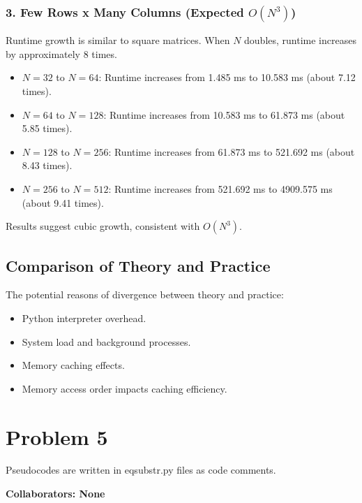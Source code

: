 \documentclass[12 pt]{article}
\begin{document}
\subsubsection*{3. Few Rows x Many Columns (Expected $O(N^3)$)}
Runtime growth is similar to square matrices. When $N$ doubles, runtime increases by approximately 8 times.

    \begin{itemize}
        \item $N = 32$ to $N = 64$: Runtime increases from 1.485 ms to 10.583 ms (about 7.12 times).
        \item $N = 64$ to $N = 128$: Runtime increases from 10.583 ms to 61.873 ms (about 5.85 times).
        \item $N = 128$ to $N = 256$: Runtime increases from 61.873 ms to 521.692 ms (about 8.43 times).
        \item $N = 256$ to $N = 512$: Runtime increases from 521.692 ms to 4909.575 ms (about 9.41 times).
    \end{itemize}
Results suggest cubic growth, consistent with $O(N^3)$.


\subsection*{Comparison of Theory and Practice}
The potential reasons of divergence between theory and practice:
    \begin{itemize}
        \item Python interpreter overhead.
        \item System load and background processes.
        \item Memory caching effects.
        \item Memory access order impacts caching efficiency.
    \end{itemize}

\vspace{1cm}

\section*{Problem 5}
Pseudocodes are written in eqsubstr.py files as code comments.

\noindent\textbf{Collaborators: None}
\end{document}
